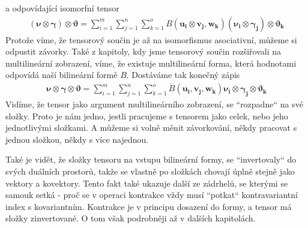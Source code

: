 \documentclass[a5paper,12pt]{amsbook}
\theoremstyle{definition}
\newcommand{\myvec}[1]{\bm{#1}}
\begin{document}
a odpovídající isomorfní tensor
\begin{equation*}
\begin{split}
(\myvec{\nu}\otimes\myvec{\gamma})\otimes\myvec{\vartheta} =
  \sum_{i=1}^{m}\sum_{j=1}^{n}\sum_{k=1}^{o} B(\myvec{u_i}\otimes\myvec{v_j}, \myvec{w_k})
    (\myvec{\nu_i}\otimes\myvec{\gamma_j})\otimes\myvec{\vartheta_k}
\end{split}
\end{equation*}
Protože víme, že tensorový součin je až na isomorfismus asociativní, můžeme si odpustit závorky.
Také z kapitoly, kdy jsme tensorový součin rozšiřovali na multilineární zobrazení, víme, že existuje
multilineární forma, která hodnotami odpovídá naší bilineární formě $B$. Dostáváme tak konečný
zápis
\begin{equation*}
\begin{split}
\myvec{\nu}\otimes\myvec{\gamma}\otimes\myvec{\vartheta} =
  \sum_{i=1}^{m}\sum_{j=1}^{n}\sum_{k=1}^{o} \dot{B}(\myvec{u_i}, \myvec{v_j}, \myvec{w_k})
    \myvec{\nu_i}\otimes\myvec{\gamma_j}\otimes\myvec{\vartheta_k}
\end{split}
\end{equation*}
Vidíme, že tensor jako argument multilineárního zobrazení, se ``rozpadne`` na své složky. Proto je nám
jedno, jestli pracujeme s tensorem jako celek, nebo jeho jednotlivými složkami. A můžeme si volně
měnit závorkování, někdy pracovat s jednou složkou, někdy s více najednou.

Také je vidět, že složky tensoru na vstupu bilineární formy, se ``invertovaly`` do svých duálních
prostorů, takže se vlastně po složkách chovají úplně stejně jako vektory a kovektory. Tento fakt
také ukazuje další ze zádrhelů, se kterými se samouk setká - proč se v operaci kontrakce vždy musí
``potkat`` kontravariantní index s kovariantním. Kontrakce je v principu dosazení do formy, a tensor
má složky zinvertované. O tom však podrobněji až v dalších kapitolách.
\end{document}
